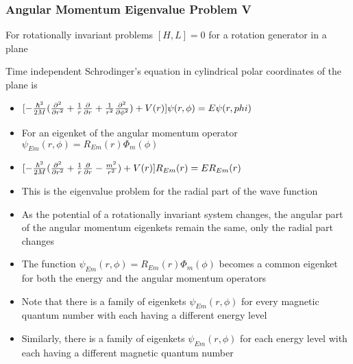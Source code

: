\documentclass[8pt,t,mathserif,aspectratio=169]{beamer}
\begin{document}
\begin{frame}
  \frametitle{Angular Momentum Eigenvalue Problem V}
  \vspace{1mm}
  For rotationally invariant problems $[H,L] = 0$ for a rotation generator in a plane

  Time independent Schrodinger's equation in cylindrical polar coordinates of the plane is
  \begin{itemize}
    \item $[-{\hbar^2 \over 2 M} ({\partial^2 \over \partial r^2} + {1 \over r} {\partial \over \partial r} + {1 \over r^2} {\partial^2 \over \partial \phi^2}) + V(r)] \psi(r,\phi) = E \psi(r,phi)$
    \item For an eigenket of the angular momentum operator $\psi_{Em}(r,\phi) = R_{Em}(r) \Phi_m(\phi)$
    \item $[-{\hbar^2 \over 2 M} ({\partial^2 \over \partial r^2} + {1 \over r} {\partial \over \partial r}- {m^2 \over r^2} ) + V(r)] R_{Em}(r) = E R_{Em}(r)$
    \item This is the eigenvalue problem for the radial part of the wave function
    \item As the potential of a rotationally invariant system changes, the angular part of the angular momentum eigenkets remain the same, only the radial part changes
    \item The function $\psi_{Em}(r,\phi) = R_{Em}(r) \Phi_m(\phi)$ becomes a common eigenket for both the energy and the angular momentum operators
    \item Note that there is a family of eigenkets $\psi_{Em}(r,\phi)$ for every magnetic quantum number with each having a different energy level
    \item Similarly, there is a family of eigenkets $\psi_{Em}(r,\phi)$ for each energy level with each having a different magnetic quantum number
  \end{itemize}
\end{frame}
\end{document}
